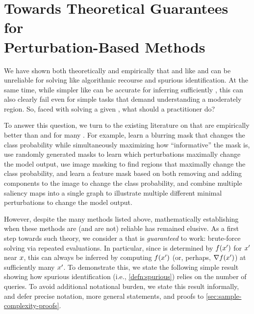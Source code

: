 %

\section{Towards Theoretical Guarantees for\\ Perturbation-Based Methods}\label{sec:sample-complexity}

We have shown both theoretically and empirically that \completename{} and \additivename{} \fielddefnames{} like \shap{} and \intgradshort{} can be unreliable for solving \downtasknames{} like algorithmic recourse and spurious \covname{} identification.
At the same time, while simpler \fielddefnames{} like \vanillagrad{} can be accurate for inferring sufficiently \localname{} \modbehaviourname{}, this can also clearly fail even for simple tasks that demand understanding a moderately \localname{} region.
So, faced with solving a given \downtaskname{}, what should a practitioner do?

To answer this question, we turn to the existing literature on \fielddefnames{} that are empirically better than \shap{} and \intgradshort{} for many \tasknames{}.
For example,
\citet{fong2017interpretable} learn a blurring mask that changes the class probability while simultaneously maximizing how ``informative'' the mask is,
\citet{petsiuk18rise} use randomly generated masks to learn which perturbations maximally change the model output,
\citet{kapishnikov19xrai} use image masking to find regions that maximally change the class probability,
\citet{qi2019visualizing} and \citet{khorram2021igos++} learn a feature mask based on both removing and adding components to the image to change the class probability,
and \citet{shitole2021one} combine multiple saliency maps into a single graph to illustrate multiple different minimal perturbations to change the model output.


However, despite the many methods listed above, mathematically establishing when these methods are (and are not) reliable has remained elusive.
As a first step towards such theory, we consider a \methodname{} that is \emph{guaranteed} to work: brute-force solving \downtasknames{} via repeated \modelname{} evaluations.
In particular, since \countmodbehaviourname{} is determined by $f(x')$ for $x'$ near $x$, this can always be inferred by computing $f(x')$ (or, perhaps, $\nabla f(x')$) at sufficiently many \obsnames{} $x'$.
To demonstrate this, we state the following simple result showing how spurious \covname{} identification (i.e., \cref{defn:spurious}) relies on the number of queries.
To avoid additional notational burden, we state this result informally, and defer precise notation, more general statements, and proofs to \cref{sec:sample-complexity-proofs}.

